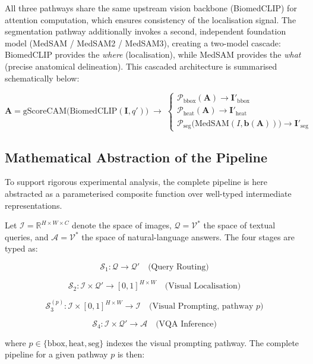 All three pathways share the same upstream vision backbone (BiomedCLIP) for attention computation, which ensures consistency of the localisation signal. The segmentation pathway additionally invokes a second, independent foundation model (MedSAM / MedSAM2 / MedSAM3), creating a two-model cascade: BiomedCLIP provides the \textit{where} (localisation), while MedSAM provides the \textit{what} (precise anatomical delineation). This cascaded architecture is summarised schematically below:

\[
\mathbf{A} = \text{gScoreCAM}\!\bigl(\text{BiomedCLIP}(\mathbf{I}, q')\bigr) \;\longrightarrow\; \begin{cases} \mathcal{P}_{\text{bbox}}(\mathbf{A}) \to \mathbf{I}'_{\text{bbox}} \\[4pt] \mathcal{P}_{\text{heat}}(\mathbf{A}) \to \mathbf{I}'_{\text{heat}} \\[4pt] \mathcal{P}_{\text{seg}}\!\bigl(\text{MedSAM}(I, \mathbf{b}(\mathbf{A}))\bigr) \to \mathbf{I}'_{\text{seg}} \end{cases}
\]

\subsection{Mathematical Abstraction of the Pipeline}
\label{sec:3_1_4}

To support rigorous experimental analysis, the complete pipeline is here abstracted as a parameterised composite function over well-typed intermediate representations.

Let $\mathcal{I} = \mathbb{R}^{H \times W \times C}$ denote the space of images, $\mathcal{Q} = \mathcal{V}^*$ the space of textual queries, and $\mathcal{A} = \mathcal{V}^*$ the space of natural-language answers. The four stages are typed as:

\[
\mathcal{S}_1 : \mathcal{Q} \to \mathcal{Q}' \quad \text{(Query Routing)}
\]

\[
\mathcal{S}_2 : \mathcal{I} \times \mathcal{Q}' \to [0, 1]^{H \times W} \quad \text{(Visual Localisation)}
\]

\[
\mathcal{S}_3^{(p)} : \mathcal{I} \times [0, 1]^{H \times W} \to \mathcal{I} \quad \text{(Visual Prompting, pathway } p \text{)}
\]

\[
\mathcal{S}_4 : \mathcal{I} \times \mathcal{Q}' \to \mathcal{A} \quad \text{(VQA Inference)}
\]

where $p \in \{\text{bbox}, \text{heat}, \text{seg}\}$ indexes the visual prompting pathway. The complete pipeline for a given pathway $p$ is then:

